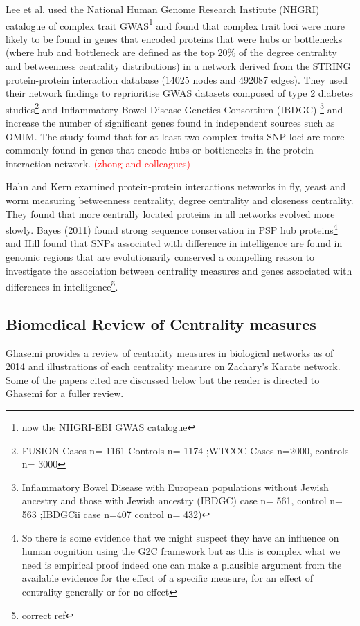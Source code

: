 Lee et al.\cite{lee2013network} used the National Human Genome Research Institute (NHGRI)  catalogue of complex trait GWAS\footnote{now the NHGRI-EBI GWAS catalogue} and found that complex trait loci were more likely to be found in genes that encoded proteins that were hubs or bottlenecks (where hub and bottleneck are defined as the top 20\% of the degree centrality and betweenness centrality distributions) in a network derived from the STRING protein-protein interaction database (14025 nodes and 492087 edges). They used their network findings to reprioritise GWAS datasets composed of type 2 diabetes studies\footnote{ FUSION  Cases n=	1161 Controls n=	1174 ;WTCCC Cases n=2000, controls n= 3000 } and Inflammatory Bowel Disease Genetics Consortium (IBDGC) \footnote{Inflammatory Bowel Disease   with European populations without Jewish ancestry and those with Jewish ancestry (IBDGC) case n=	561, control n=	563 ;IBDGCii case n=407 control n=	432)} and increase the number of significant genes found in independent sources such as OMIM\cite{hamosh2005online}.  The study found that for at least two complex traits SNP loci are more commonly found in genes that encode hubs or bottlenecks in the protein interaction network. 
\textcolor{red}{(zhong and colleagues)}\cite{zhong2013prediction}



Hahn and Kern\cite{hahn2005comparative} examined protein-protein interactions networks in fly, yeast and worm measuring betweenness centrality, degree centrality and closeness centrality. They found that more centrally located proteins in all networks evolved more slowly. Bayes (2011)\cite{bayes2011characterization} found strong sequence conservation in PSP hub proteins\footnote{ So there is some evidence that we might suspect they have an influence on human cognition using the G2C framework but as this is complex what we need is empirical proof indeed one can make a plausible argument from the available evidence for the effect of a specific measure, for an effect of centrality generally or for no effect} and Hill found that SNPs associated with difference in intelligence are found in genomic regions that are evolutionarily conserved\cite{hill2016molecular} a compelling reason to investigate the association between centrality measures and genes associated with differences in intelligence\footnote{correct ref}.




\subsection{Biomedical Review of Centrality measures}
\label{sec:biomedical review centrality}
Ghasemi provides a review of centrality measures in biological networks as of 2014 and illustrations of each centrality measure on Zachary's Karate network\cite{ghasemi2014centrality}. Some of the papers cited are discussed below but the reader is directed to Ghasemi \cite{ghasemi2014centrality} for a fuller review. 


